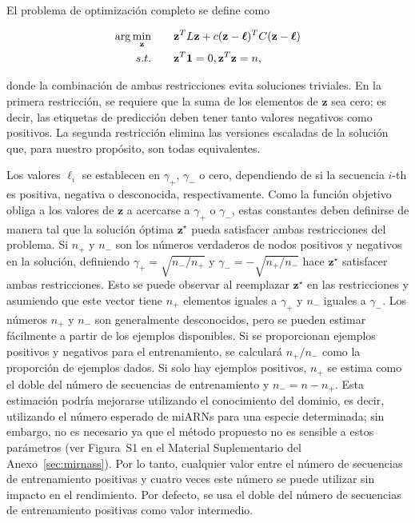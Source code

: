 El problema de optimización completo se define como

\begin{equation}
	\begin{split}
		\arg\min_{\mathbf{z}} & \qquad \mathbf{z}^TL\mathbf{z} +c(\mathbf{z}-\boldsymbol\ell)^TC(\mathbf{z}-\boldsymbol\ell) \\
		s.t. & \qquad \mathbf{z}^T\mathbf{1} = 0, \mathbf{z}^T\mathbf{z} = n,
	\end{split}
\end{equation}

\noindent donde la combinación de ambas restricciones evita soluciones triviales. En la primera restricción, se requiere que la suma de los elementos de
$\mathbf{z}$ sea cero; es decir, las etiquetas de predicción deben tener tanto valores negativos como positivos. La segunda restricción elimina las versiones
escaladas de la solución que, para nuestro propósito, son todas equivalentes.

Los valores $\ell_{i}$ se establecen en $\gamma_{+}$, $\gamma_{-}$ o cero, dependiendo de si la secuencia $ i $-th es positiva, negativa o desconocida,
respectivamente. Como la función objetivo obliga a los valores de $\mathbf{z}$ a acercarse a $\gamma_{+}$ o $\gamma_{-}$, estas constantes deben definirse de
manera tal que la solución óptima $\mathbf{z}^\star$ pueda satisfacer ambas restricciones del problema. Si $n_{+}$ y $n_{-}$ son los números verdaderos de
nodos positivos y negativos en la solución, definiendo $\gamma_{+} = \sqrt{n_{-}/n_{+}}$ y $\gamma_{-}=-\sqrt{n_{+}/n_{-}}$ hace $\mathbf{z}^\star$ satisfacer
ambas restricciones. Esto se puede observar al reemplazar $\mathbf{z}^\star$ en las restricciones y asumiendo que este vector tiene $n_{+}$ elementos iguales a
$\gamma_{+}$ y $n_{-}$ iguales a $\gamma_{-}$. Los números $n_{+}$ y $n_{-}$ son generalmente desconocidos, pero se pueden estimar fácilmente a partir de los
ejemplos disponibles. Si se proporcionan ejemplos positivos y negativos para el entrenamiento, se calculará $n_{+}/n_{-}$ como la proporción de ejemplos
dados. Si solo hay ejemplos positivos, $n_{+}$ se estima como el doble del número de secuencias de entrenamiento y $n_{-} = n - n_{+}$. Esta estimación
podría mejorarse utilizando el conocimiento del dominio, es decir, utilizando el número esperado de miARNs para una especie determinada; sin embargo, no es
necesario ya que el método propuesto no es sensible a estos parámetros (ver Figura~S1 en el Material Suplementario del Anexo~\ref{sec:mirnass}). Por lo tanto,
cualquier valor entre el número de secuencias de entrenamiento positivas y cuatro veces este número se puede utilizar sin impacto en el rendimiento. Por defecto,
se usa el doble del número de secuencias de entrenamiento positivas como valor intermedio.

